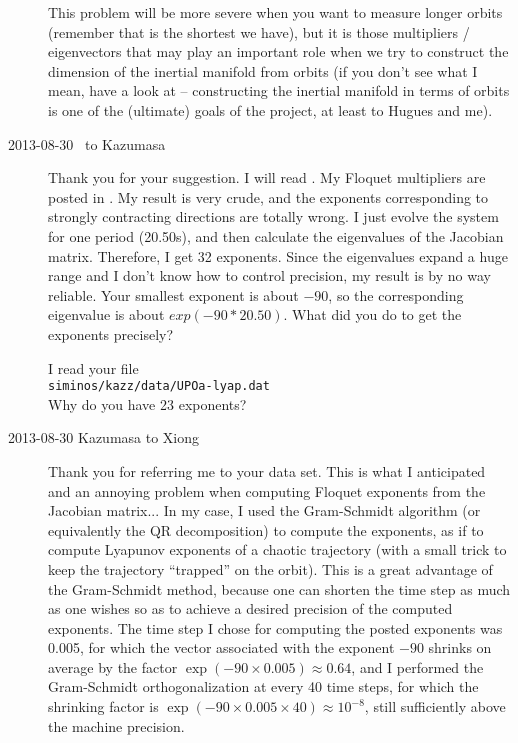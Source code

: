\begin{description}
This problem will be more severe when you want to measure longer orbits
 (remember that  is the shortest we have),
 but it is those multipliers / eigenvectors that may play an important role
 when we try to construct the dimension of the inertial manifold from orbits
 (if you don't see what I mean, have a look at 
 -- constructing the inertial manifold in terms of orbits
 is one of the (ultimate) goals of the project, at least to Hugues and me).

 \item[2013-08-30 \XD\ to Kazumasa]
 Thank you for your suggestion. I will read .
 My Floquet multipliers are posted in . My result is
 very crude, and the exponents corresponding to strongly contracting directions
 are totally wrong. I just evolve the system for one period (20.50s), and then
 calculate the eigenvalues of the Jacobian matrix. Therefore, I get 32 exponents.
 Since the eigenvalues expand a huge range and I don't know how to control
 precision, my result is by no way reliable. Your smallest exponent is
 about $-90$, so the corresponding eigenvalue is about $exp(-90*20.50)$.
 What did you do to get the exponents precisely?

 I read your file \\
 \texttt{siminos/kazz/data/UPOa-lyap.dat}\\
 Why do you have 23 exponents?

\item[2013-08-30 Kazumasa to Xiong]
Thank you for referring me to your data set.
This is what I anticipated and an annoying problem
 when computing Floquet exponents from the Jacobian matrix...
In my case, I used the Gram-Schmidt algorithm
 (or equivalently the QR decomposition) to compute the exponents,
 as if to compute Lyapunov exponents of a chaotic trajectory
 (with a small trick to keep the trajectory ``trapped'' on the orbit).
This is a great advantage of the Gram-Schmidt method,
 because one can shorten the time step as much as one wishes
 so as to achieve a desired precision of the computed exponents.
The time step I chose for computing the posted exponents was 0.005,
 for which the vector associated with the exponent $-90$ shrinks
 on average by the factor $\exp(-90 \times 0.005) \approx 0.64$,
 and I performed the Gram-Schmidt orthogonalization
 at every 40 time steps, for which the shrinking factor is
 $\exp(-90 \times 0.005 \times 40) \approx 10^{-8}$,
 still sufficiently above the machine precision.


\end{description}
